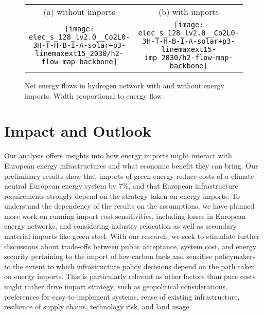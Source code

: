 \documentclass[10pt,5p,reversenotenum,lefttitle]{elsarticle}
\renewcommand{\ttdefault}{\sfdefault}
\begin{document}
\begin{figure*}
    \centering\small
    \begin{tabular}{cc}
        (a) without imports & (b) with imports \\
        \texttt{[image: elec\_s\_128\_lv2.0\_\_Co2L0-3H-T-H-B-I-A-solar+p3-linemaxext15\_2030/h2-flow-map-backbone]}
        &
        \texttt{[image: elec\_s\_128\_lv2.0\_\_Co2L0-3H-T-H-B-I-A-solar+p3-linemaxext15-imp\_2030/h2-flow-map-backbone]}
    \end{tabular}
    \caption{Net energy flows in hydrogen network with and without energy imports. Width proportional to energy flow.}
    \label{fig:hydrogen-flows}
\end{figure*}



\section*{Impact and Outlook}

Our analysis offers insights into how energy imports might interact with
European energy infrastructures and what economic benefit they can bring. Our
preliminary results show that imports of green energy reduce costs of a
climate-neutral European energy system by 7\%, and that European infrastructure
requirements strongly depend on the strategy taken on energy imports. To
understand the dependency of the results on the assumptions, we have planned
more work on running import cost sensitivities, including losses in European
energy networks, and considering industry relocation as well as secondary
material imports like green steel. With our research, we seek to stimulate
further discussions about trade-offs between public acceptance, system cost, and
energy security pertaining to the import of low-carbon fuels and sensitise
policymakers to the extent to which infrastructure policy decisions depend on
the path taken on energy imports. This is particularly relevant as other factors
than pure costs might rather drive import strategy, such as geopolitical
considerations, preferences for easy-to-implement systems, reuse of existing
infrastructure, resilience of supply chains, technology risk, and land usage.

\renewcommand{\ttdefault}{\sfdefault}

\end{document}
